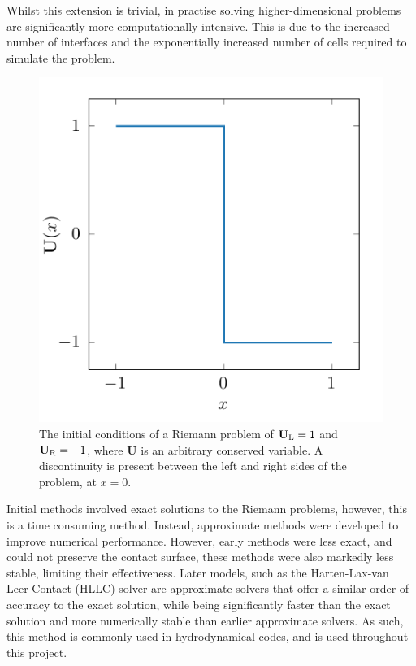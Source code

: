 \noindent
Whilst this extension is trivial, in practise solving higher-dimensional problems are significantly more computationally intensive.
This is due to the increased number of interfaces and the exponentially increased number of cells required to simulate the problem.

\begin{figure}[ht]
  \centering
  \includegraphics[]{assets/riemann-interface/riemann.pdf}
  \caption[A Riemann problem]{The initial conditions of a Riemann problem of $\mathbf{U}_\text{L} = 1$ and $\mathbf{U}_\text{R} = -1$, where $\mathbf{U}$ is an arbitrary conserved variable. A discontinuity is present between the left and right sides of the problem, at $x=0$.}
  \label{fig:riemann}
\end{figure}

Initial methods involved exact solutions to the Riemann problems, however, this is a time consuming method.
Instead, approximate methods were developed to improve numerical performance.
However, early methods were less exact, and could not preserve the contact surface, these methods were also markedly less stable, limiting their effectiveness.
Later models, such as the Harten-Lax-van Leer-Contact (HLLC) solver \parencite{toroRestorationContactSurface1994} are approximate solvers that offer a similar order of accuracy to the exact solution, while being significantly faster than the exact solution and more numerically stable than earlier approximate solvers.
As such, this method is commonly used in hydrodynamical codes, and is used throughout this project.

